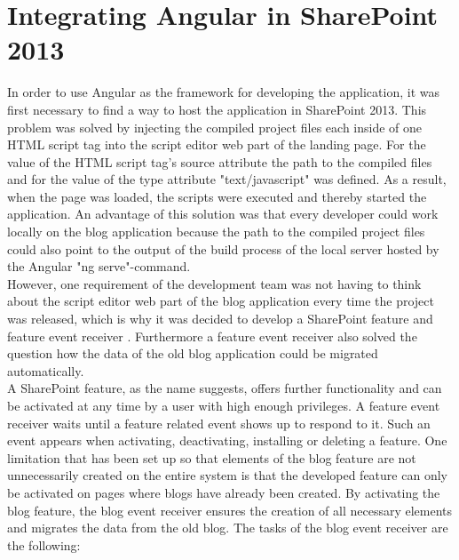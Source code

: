 \documentclass[Bachelor,BIF,english]{twbook}
\begin{document}
\section{Integrating Angular in SharePoint 2013}
In order to use Angular as the framework for developing the application, it was first necessary to find a way to host the application in SharePoint 2013. This problem was solved by injecting the compiled project files each inside of one HTML script tag into the script editor web part of the landing page. For the value of the HTML script tag's source attribute the path to the compiled files and for the value of the type attribute "text/javascript" was defined. As a result, when the page was loaded, the scripts were executed and thereby started the application. An advantage of this solution was that every developer could work locally on the blog application because the path to the compiled project files could also point to the output of the build process of the local server hosted by the Angular "ng serve"-command.
\\[\baselineskip]
However, one requirement of the development team was not having to think about the script editor web part of the blog application every time the project was released, which is why it was decided to develop a SharePoint feature \cite{SPFeature} and feature event receiver \cite{SPFeatureEventReceiver}. Furthermore a feature event receiver also solved the question how the data of the old blog application could be migrated automatically.
\\[\baselineskip]
A SharePoint feature, as the name suggests, offers further functionality and can be activated at any time by a user with high enough privileges. A feature event receiver waits until a feature related event shows up to respond to it. Such an event appears when activating, deactivating, installing or deleting a feature. One limitation that has been set up so that elements of the blog feature are not unnecessarily created on the entire system is that the developed feature can only be activated on pages where blogs have already been created. By activating the blog feature, the blog event receiver ensures the creation of all necessary elements and migrates the data from the old blog. The tasks of the blog event receiver are the following:
\end{document}
